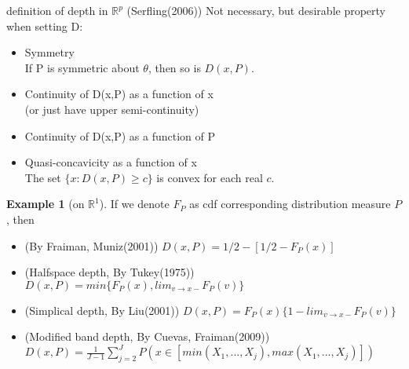 \documentclass[aspectratio=169,ignorenonframetext,9pt]{beamer}
\theoremstyle{plain}
\theoremstyle{definition}
\newtheorem{exmp}{Example}[section]
\begin{document}
\begin{frame}{definition of depth in $\mathbb{R}^p$}
    (Serfling(2006)) Not necessary, but desirable property when setting D:
    \begin{itemize}
        \item Symmetry \\
            If P is symmetric about $\theta$, then so is $D(x,P)$.
        \item Continuity of D(x,P) as a function of x \\
            (or just have upper semi-continuity)
        \item Continuity of D(x,P) as a function of P
        \item Quasi-concavicity as a function of x \\
            The set $\{x:D(x,P)\geq c\}$ is convex for each real $c$.
    \end{itemize}

    \begin{exmp} [on $\mathbb{R}^1$]
        If we denote $F_P$ as cdf corresponding distribution measure $P$, then
        \begin{itemize}
            \item (By Fraiman, Muniz(2001)) $D(x,P)=1/2-[1/2-F_P(x)]$
            \item (Halfspace depth, By Tukey(1975)) $D(x,P)=min\{F_P(x), lim_{v\rightarrow x-}F_P(v)\}$
            \item (Simplical depth, By Liu(2001)) $D(x,P)=F_P(x)\{1-lim_{v\rightarrow x-} F_P(v)\}$
            \item (Modified band depth, By Cuevas, Fraiman(2009)) $D(x,P)=\frac{1}{J-1}\sum_{j=2}^J P(x\in [min(X_1,...,X_j), max(X_1,...,X_j)])$
        \end{itemize}
    \end{exmp}
\end{frame}
\end{document}

